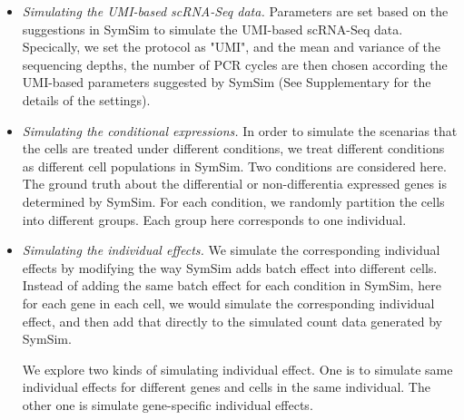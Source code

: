 \documentclass[fleqn,10pt]{wlscirep}
\begin{document}
\begin{itemize}
\item
  {\it Simulating the UMI-based scRNA-Seq data.} Parameters are set
  based on the suggestions in SymSim to simulate the UMI-based
  scRNA-Seq data. Specically, we set the protocol as "UMI", and the
  mean and variance of the sequencing depths, the number of PCR cycles
  are then chosen according the UMI-based parameters suggested by
  SymSim (See Supplementary for the details of the settings).
  
\item {\it Simulating the conditional expressions.} In order to
  simulate the scenarias that the cells are treated under different
  conditions, we treat different conditions as different
  cell populations in SymSim. Two conditions are considered here. The
  ground truth about the differential or non-differentia expressed genes
  is determined by SymSim. For each condition, we randomly partition the
  cells into different groups. Each group here corresponds to one
  individual.
\item
  {\it Simulating the individual effects.}
  We simulate the corresponding individual
  effects by modifying the way SymSim adds batch effect into
  different cells. Instead of adding the same batch effect for each
  condition in SymSim, here for each gene in each cell, we would
  simulate the corresponding individual effect, and then add that
  directly to the simulated count data generated by SymSim.

  We explore two kinds of simulating individual effect. One is to
  simulate same individual effects for different genes and cells
  in the same individual. The other one is simulate gene-specific
  individual effects.
  

\end{itemize}
\end{document}
